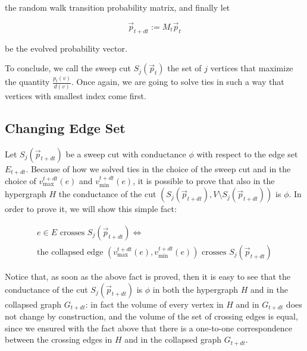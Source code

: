 \documentclass[../main.tex]{subfiles}
\begin{document}
the random walk transition probability matrix, and finally let 

\begin{equation} 
    \vec{p}_{t+dt} := M_t \vec{p}_t
\end{equation}

be the evolved probability vector.

To conclude, we call the sweep cut $S_j(\vec{p}_t)$ the set of $j$ vertices that maximize the quantity $\frac{p_t(v)}{d(v)}$. Once again, we are going to solve ties in such a way that vertices with smallest index come first.

\subsection{Changing Edge Set}
\label{subsubsec:changing_edge_set}

Let $S_j(\vec{p}_{t+dt})$ be a sweep cut with conductance $\phi$ with respect to the edge set $E_{t+dt}$. Because of how we solved ties in the choice of the sweep cut and in the choice of $v_{\text{max}}^{t+dt}(e)$ and $v_{\text{min}}^{t+dt}(e)$, it is possible to prove that also in the hypergraph $H$ the conductance of the cut $(S_j(\vec{p}_{t+dt}), V \setminus S_j(\vec{p}_{t+dt}))$ is $\phi$. In order to prove it, we will show this simple fact: 
\begin{fact}
\begin{multline}
    e \in E \text{ crosses } S_j(\vec{p}_{t+dt}) \iff \\ \text{the collapsed edge } (v_{\text{max}}^{t+dt}(e), v_{\text{min}}^{t+dt}(e)) \text{ crosses } S_j(\vec{p}_{t+dt})
\end{multline}
\end{fact}

Notice that, as soon as the above fact is proved, then it is easy to see that the conductance of the cut $S_j(\vec{p}_{t+dt})$ is $\phi$ in both the hypergraph $H$ and in the collapsed graph $G_{t+dt}$: in fact the volume of every vertex in $H$ and in $G_{t+dt}$ does not change by construction, and the volume of the set of crossing edges is equal, since we ensured with the fact above that there is a one-to-one correspondence between the crossing edges in $H$ and in the collapsed graph $G_{t+dt}$. 
\end{document}
